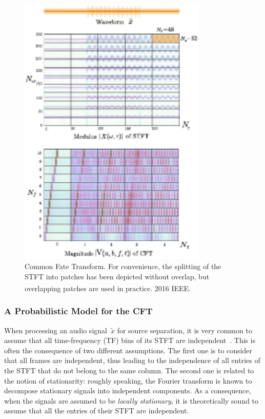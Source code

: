 \begin{figure}[t]
\centering
\includegraphics[width=0.8\textwidth]{Chapters/06_Separation_Unknown/figures/CFT}
\caption{Common Fate Transform. For convenience, the splitting of the STFT
into patches has been depicted without overlap, but overlapping patches are used in practice\label{fig:CFT}. \textsuperscript{\textregistered}2016 IEEE.}
\end{figure}

\subsubsection{A Probabilistic Model for the CFT}

\label{ssub:separation}

When processing an audio signal~$\tilde{x}$ for source separation, it is very common to assume that all time-frequency (TF) bins of its \acs{STFT} are independent~\cite{fevotte09, duong10, ozerov12, liutkus11t}.
This is often the consequence of two different assumptions.
The first one is to consider that all frames are independent, thus leading to the independence of all entries of the \acs{STFT} that do not belong to the same column. The second one is related to the notion of stationarity:
roughly speaking, the Fourier transform is known to decompose stationary signals into independent components.
As a consequence, when the signals are assumed to be \emph{locally stationary}, it is theoretically sound to assume that all the entries of
their \acs{STFT} are independent.

